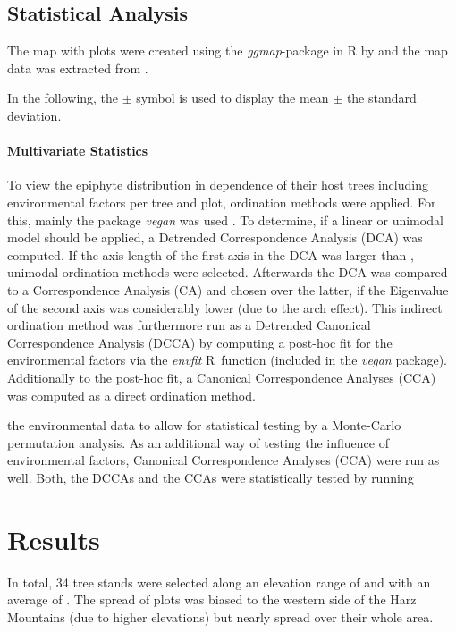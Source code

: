 \documentclass[12pt, a4paper, oneside, draft]{scrartcl}
\begin{document}
	\subsection{Statistical Analysis}
	
	The map with plots were created using the \textit{ggmap}-package in R by \textcite{Kahle2013} and the map data was extracted from \textcite{GoogleMaps2017}.
	
	In the following, the $\pm$ symbol is used to display the mean $\pm$ the standard deviation.
		
		\paragraph{Multivariate Statistics} 
		To view the epiphyte distribution in dependence of their host trees including environmental factors per tree and plot, ordination methods were applied. For this, mainly the package \textit{vegan} was used \parencite{Oksanen2017}. To determine, if a linear or unimodal model should be applied, a Detrended Correspondence Analysis (DCA) was computed. If the axis length of the first axis in the DCA was larger than , unimodal ordination methods were selected. Afterwards the DCA was compared to a Correspondence Analysis (CA) and chosen over the latter, if the Eigenvalue of the second axis was considerably lower (due to the arch effect). This indirect ordination method was furthermore run as a Detrended Canonical Correspondence Analysis (DCCA) by computing a post-hoc fit for the environmental factors via the \textit{envfit} R~function (included in the \textit{vegan} package). Additionally to the post-hoc fit, a Canonical Correspondence Analyses (CCA) was computed as a direct ordination method. 
		
		the environmental data to allow for statistical testing by a Monte-Carlo permutation analysis. As an additional way of testing the influence of environmental factors, Canonical Correspondence Analyses (CCA) were run as well. Both, the DCCAs and the CCAs were statistically tested by running 
		

\section{Results}
In total, 34 tree stands were selected along an elevation range of  and with an average of . The spread of plots was biased to the western side of the Harz Mountains (due to higher elevations) but nearly spread over their whole area. 
\end{document}
